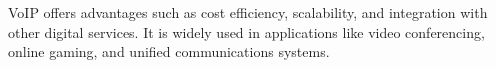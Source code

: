 VoIP offers advantages such as cost efficiency, scalability, and integration with other digital services. It is widely used in applications like video conferencing, online gaming, and unified communications systems.  

